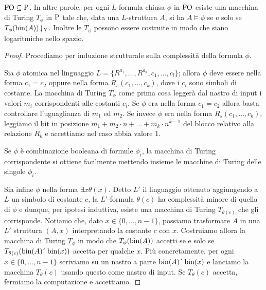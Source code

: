 \begin{lemma}
 $\FO \subseteq \P$. In altre parole, per ogni $L$-formula chiusa $\phi$ in $\FO$ esiste
 una macchina di Turing $T_\phi$ in $\P$ tale che, data una $L$-struttura $A$,
 si ha $A \models \phi$ se e solo se $T_\phi(\bin(A))\accepts$. Inoltre
 le $T_\phi$ possono essere costruite in modo che siano logaritmiche nello spazio.
\end{lemma}
\begin{proof}
 Procediamo per induzione strutturale sulla complessità della formula $\phi$.
 
 Sia $\phi$ atomica nel linguaggio $L=\{ R^{a_1},\ldots,R^{a_k},c_1,\ldots,c_l \}$;
 allora $\phi$ deve essere nella forma $c_1=c_2$ oppure nella forma $R_s(c_1,\ldots, c_k)$,
 dove i $c_i$ sono simboli di costante. La macchina di Turing $T_\phi$ come
 prima cosa leggerà dal nastro di
 input i valori $m_i$ corrispondenti alle costanti $c_i$.
 Se $\phi$ era nella forma $c_1 = c_2$ allora basta controllare l'uguaglianza
 di $m_1$ ed $m_2$. Se invece $\phi$ era nella forma $R_s(c_1,\ldots,c_k)$,
 leggiamo il bit in posizione $m_1 + m_2 \cdot n + \ldots + m_k \cdot n^{k-1}$
 del blocco relativo alla relazione $R_k$ e accettiamo nel caso abbia valore 1.
 
 Se $\phi$ è combinazione booleana di formule $\phi_i$,
 la macchina di Turing corrispondente si ottiene facilmente mettendo insieme le
 macchine di Turing delle singole $\phi_i$.
 
 Sia infine $\phi$ nella forma $\exists x \theta(x)$. Detto $L'$ il linguaggio
 ottenuto aggiungendo a $L$ un simbolo di costante $c$,
 la $L'$-formula $\theta(c)$ ha complessità minore di quella di $\phi$
 e dunque, per ipotesi induttiva, esiste una
 macchina di Turing $T_{\theta(c)}$ che gli corrisponde.
 Notiamo che, dato $x \in \{0,\ldots, n-1\}$, possiamo trasformare $A$ in una $L'$
 struttura $(A,x)$ interpretando la costante $c$ con $x$.
 Costruiamo allora la macchina di Turing $T_\phi$ in modo che $T_\phi(\bin(A))$
 accetti se e solo se $T_{\theta(c)}(\bin(A)\string^\bin(x))$ accetta per qualche $x$.
 Più concretamente, per ogni $x \in \{0,\ldots,n-1\}$
 scriviamo su un nastro a parte $\bin(A)\string^\bin(x)$ e lanciamo la macchina
 $T_\theta(c)$ usando questo come nastro di input. Se $T_\theta(c)$ accetta,
 fermiamo la computazione e accettiamo.
\end{proof}

